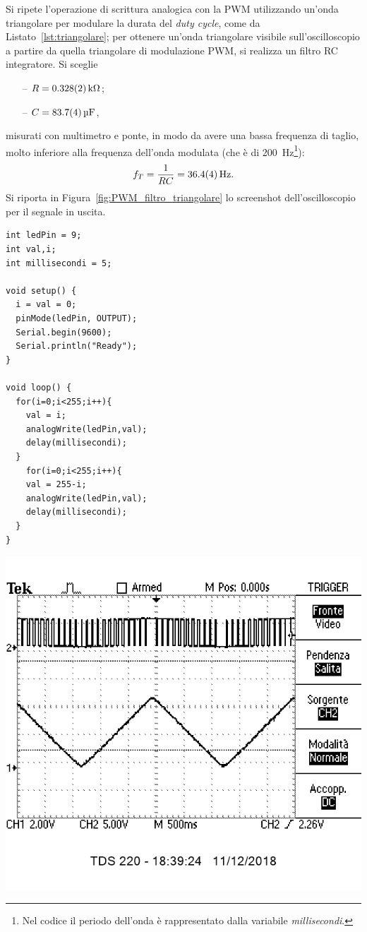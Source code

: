 \documentclass[10pt,oneside,a4paper]{article}
\newenvironment{Figure}
  {\par\medskip\noindent\minipage{\linewidth}}
  {\endminipage\par\medskip}
\begin{document}
\begin{multicols}{2}
Si ripete l'operazione di scrittura analogica con la PWM utilizzando un'onda triangolare per modulare la durata del \emph{duty cycle}, come da Listato~\ref{lst:triangolare}; per ottenere un'onda triangolare visibile sull'oscilloscopio a partire da quella triangolare di modulazione PWM, si realizza un filtro RC integratore. Si sceglie
\begin{itemize}
\item[--] $R = \SI{0.328 \pm 0.002}{\kilo\ohm}$;
\item[--] $C = \SI{83.7 \pm 0.4}{\micro\farad}$,
\end{itemize}
misurati con multimetro e ponte, in modo da avere una bassa frequenza di taglio, molto inferiore alla frequenza dell'onda modulata (che è di \SI{200}{Hz}\footnote{Nel codice il periodo dell'onda è rappresentato dalla variabile \emph{millisecondi}.}):
\[
f_T = \frac{1}{RC} = \SI{36.4 \pm 0.4}{\Hz}.
\] 
Si riporta in Figura~\ref{fig:PWM_filtro_triangolare} lo screenshot dell'oscilloscopio per il segnale in uscita.

\begin{lstlisting}[style=CStyle, caption={Codice per la scrittura PWM, modulazione triangolare}, label=lst:triangolare]
int ledPin = 9;
int val,i;
int millisecondi = 5;

void setup() {
  i = val = 0;
  pinMode(ledPin, OUTPUT);
  Serial.begin(9600);
  Serial.println("Ready");
}

void loop() {
  for(i=0;i<255;i++){
    val = i;
    analogWrite(ledPin,val);
    delay(millisecondi);    
  }
    for(i=0;i<255;i++){
    val = 255-i;
    analogWrite(ledPin,val);
    delay(millisecondi); 
  }
}
\end{lstlisting}

\begin{Figure}
	\begin{center}
	\includegraphics[width=0.9\linewidth]{triangolare2.png}
	\label{fig:PWM_filtro_triangolare}
	\end{center}
\end{Figure}


\end{multicols}
\end{document}
